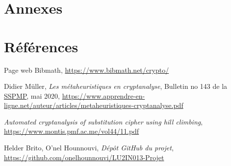 \documentclass[a4paper]{article}
\begin{document}
\clearpage
\section*{Annexes}
\label{sec:annexes}
\section*{Références}

\begin{enumerate}[label={[\arabic*]}]
    \item Page web Bibmath, \url{https://www.bibmath.net/crypto/}
    \item Didier Müller, \textit{Les métaheuristiques en cryptanalyse},  Bulletin no 143 de la \href{https://www.vsmp.ch/}{SSPMP}, mai 2020, \url{https://www.apprendre-en-ligne.net/auteur/articles/metaheuristiques-cryptanalyse.pdf}
    \item \textit{Automated cryptanalysis of substitution cipher using hill climbing}, \url{https://www.montis.pmf.ac.me/vol44/11.pdf}
    \item Helder Brito, O'nel Hounnouvi, \textit{Dépôt GitHub du projet}, \url{https://github.com/onelhounnouvi/LU2IN013-Projet}
\end{enumerate}
\end{document}
